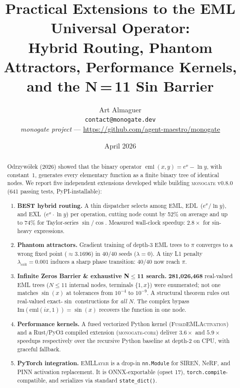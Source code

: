 \documentclass[11pt,a4paper]{article}
\title{%
  Practical Extensions to the EML Universal Operator:\\
  Hybrid Routing, Phantom Attractors, Performance Kernels,\\
  and the N{\,}={\,}11 Sin Barrier
}
\author{Art Almaguer\\
  \small \texttt{contact@monogate.dev}\\[2pt]
  \small \textit{monogate project} --- \url{https://github.com/agent-maestro/monogate}
}
\date{April 2026}
\begin{document}
\maketitle

\begin{abstract}
Odrzyw\'{o}\l{}ek (2026) showed that the binary operator
$\operatorname{eml}(x,y)=e^x - \ln y$, with constant~$1$, generates
every elementary function as a finite binary tree of identical nodes.
We report five independent extensions developed while building
\textsc{monogate} v0.8.0 (641 passing tests, PyPI-installable):

\begin{enumerate}
  \item \textbf{BEST hybrid routing.}
    A thin dispatcher selects among EML, EDL~($e^x/\ln y$), and
    EXL~($e^x \cdot \ln y$) per operation, cutting node count by 52\%
    on average and up to 74\% for Taylor-series $\sin/\cos$.
    Measured wall-clock speedup: $2.8\times$ for sin-heavy expressions.

  \item \textbf{Phantom attractors.}
    Gradient training of depth-3 EML trees to $\pi$ converges to a
    wrong fixed point ($\approx 3.1696$) in 40/40 seeds ($\lambda=0$).
    A tiny L1 penalty $\lambda_{\text{crit}}=0.001$ induces a sharp
    phase transition: 40/40 now reach $\pi$.

  \item \textbf{Infinite Zeros Barrier \& exhaustive N$\leq$11 search.}
    \textbf{281,026,468} real-valued EML trees ($N\leq11$ internal nodes,
    terminals $\{1,x\}$) were enumerated; not one matches $\sin(x)$ at
    tolerances from $10^{-4}$ to $10^{-9}$.
    A structural theorem rules out real-valued exact-$\sin$ constructions
    for \emph{all} $N$.  The complex bypass $\mathrm{Im}(\mathrm{eml}(ix,1))=\sin(x)$
    recovers the function in one node.

  \item \textbf{Performance kernels.}
    A fused vectorized Python kernel (\textsc{FusedEMLActivation}) and a
    Rust/PyO3 compiled extension (\textsc{monogate-core}) deliver $3.6\times$
    and $5.9\times$ speedups respectively over the recursive Python baseline
    at depth-2 on CPU, with graceful fallback.

  \item \textbf{PyTorch integration.}
    \textsc{EMLLayer} is a drop-in \texttt{nn.Module} for SIREN, NeRF, and
    PINN activation replacement.  It is ONNX-exportable (opset 17),
    \texttt{torch.compile}-compatible, and serializes via standard
    \texttt{state\_dict()}.
\end{enumerate}


\end{abstract}
\end{document}
